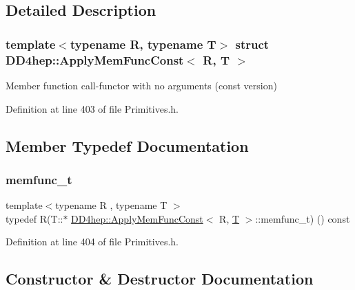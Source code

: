 \subsection{Detailed Description}
\subsubsection*{template$<$typename R, typename T$>$\newline
struct D\+D4hep\+::\+Apply\+Mem\+Func\+Const$<$ R, T $>$}

Member function call-\/functor with no arguments (const version) 

Definition at line 403 of file Primitives.\+h.



\subsection{Member Typedef Documentation}
\hypertarget{struct_d_d4hep_1_1_apply_mem_func_const_a0baa998fbf89b0c25d9de76bbd9a95e7}{}\label{struct_d_d4hep_1_1_apply_mem_func_const_a0baa998fbf89b0c25d9de76bbd9a95e7} 
\subsubsection{\texorpdfstring{memfunc\+\_\+t}{memfunc\_t}}
{\footnotesize\ttfamily template$<$typename R , typename T $>$ \\
typedef R(T\+::$\ast$ \hyperlink{struct_d_d4hep_1_1_apply_mem_func_const}{D\+D4hep\+::\+Apply\+Mem\+Func\+Const}$<$ R, \hyperlink{class_t}{T} $>$\+::memfunc\+\_\+t) () const}



Definition at line 404 of file Primitives.\+h.



\subsection{Constructor \& Destructor Documentation}
\hypertarget{struct_d_d4hep_1_1_apply_mem_func_const_a2ced0eb9c81ba9bb827054c2afc42961}{}\label{struct_d_d4hep_1_1_apply_mem_func_const_a2ced0eb9c81ba9bb827054c2afc42961} 
